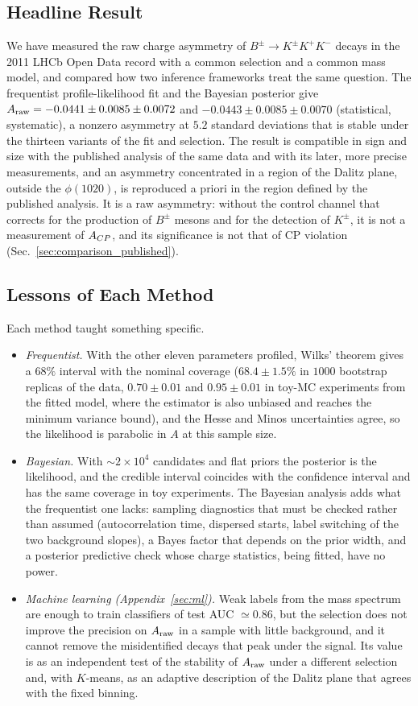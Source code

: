 \subsection{Headline Result}
We have measured the raw charge asymmetry of $B^\pm\to K^\pm K^+K^-$ decays in the 2011 LHCb Open Data record with a common selection and a common mass model, and compared how two inference frameworks treat the same question. The frequentist profile-likelihood fit and the Bayesian posterior give $A_{\mathrm{raw}}=-0.0441\pm0.0085\pm0.0072$ and $-0.0443\pm0.0085\pm0.0070$ (statistical, systematic), a nonzero asymmetry at $5.2$ standard deviations that is stable under the thirteen variants of the fit and selection. The result is compatible in sign and size with the published analysis of the same data and with its later, more precise measurements, and an asymmetry concentrated in a region of the Dalitz plane, outside the $\phi(1020)$, is reproduced a priori in the region defined by the published analysis. It is a raw asymmetry: without the control channel that corrects for the production of $B^\pm$ mesons and for the detection of $K^\pm$, it is not a measurement of $A_{CP}$, and its significance is not that of CP violation (Sec.~\ref{sec:comparison_published}).

\subsection{Lessons of Each Method}
Each method taught something specific.
\begin{itemize}[leftmargin=*,itemsep=2pt]
\item \emph{Frequentist.} With the other eleven parameters profiled, Wilks' theorem gives a $68\%$ interval with the nominal coverage ($68.4\pm1.5\%$ in $1000$ bootstrap replicas of the data, $0.70\pm0.01$ and $0.95\pm0.01$ in toy-MC experiments from the fitted model, where the estimator is also unbiased and reaches the minimum variance bound), and the Hesse and Minos uncertainties agree, so the likelihood is parabolic in $A$ at this sample size.
\item \emph{Bayesian.} With $\sim2\times10^4$ candidates and flat priors the posterior is the likelihood, and the credible interval coincides with the confidence interval and has the same coverage in toy experiments. The Bayesian analysis adds what the frequentist one lacks: sampling diagnostics that must be checked rather than assumed (autocorrelation time, dispersed starts, label switching of the two background slopes), a Bayes factor that depends on the prior width, and a posterior predictive check whose charge statistics, being fitted, have no power.
\item \emph{Machine learning (Appendix~\ref{sec:ml}).} Weak labels from the mass spectrum are enough to train classifiers of test AUC $\simeq0.86$, but the selection does not improve the precision on $A_{\mathrm{raw}}$ in a sample with little background, and it cannot remove the misidentified decays that peak under the signal. Its value is as an independent test of the stability of $A_{\mathrm{raw}}$ under a different selection and, with $K$-means, as an adaptive description of the Dalitz plane that agrees with the fixed binning.
\end{itemize}

